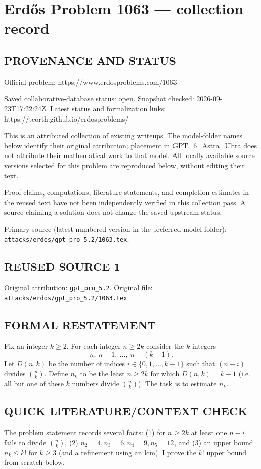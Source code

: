 \section*{Erd\H{o}s Problem 1063 --- collection record}

\subsection*{PROVENANCE AND STATUS}
Official problem: https://www.erdosproblems.com/1063

Saved collaborative-database status: open.
Snapshot checked: 2026-09-23T17:22:24Z.
Latest status and formalization links: https://teorth.github.io/erdosproblems/

This is an attributed collection of existing writeups. The model-folder names below identify their original attribution; placement in GPT\_6\_Astra\_Ultra does not attribute their mathematical work to that model. All locally available source versions selected for this problem are reproduced below, without editing their text.

Proof claims, computations, literature statements, and completion estimates in the reused text have not been independently verified in this collection pass. A source claiming a solution does not change the saved upstream status.

Primary source (latest numbered version in the preferred model folder): \texttt{attacks/erdos/gpt\_pro\_5.2/1063.tex}.

\subsection*{REUSED SOURCE 1}
Original attribution: \texttt{gpt\_pro\_5.2}.
Original file: \texttt{attacks/erdos/gpt\_pro\_5.2/1063.tex}.


\subsection*{FORMAL RESTATEMENT}
Fix an integer $k\ge 2$. For each integer $n\ge 2k$ consider the $k$ integers
\[
 n,\ n-1,\ \dots,\ n-(k-1).
\]
Let $D(n,k)$ be the number of indices $i\in\{0,1,\dots,k-1\}$ such that $(n-i)$ divides $\binom{n}{k}$.
Define $n_k$ to be the least $n\ge 2k$ for which $D(n,k)=k-1$ (i.e. all but one of these $k$ numbers divide $\binom{n}{k}$).
The task is to estimate $n_k$.

\subsection*{QUICK LITERATURE/CONTEXT CHECK}
The problem statement records several facts: (1) for $n\ge 2k$ at least one $n-i$ fails to divide $\binom{n}{k}$, (2) $n_2=4,n_3=6,n_4=9,n_5=12$, and (3) an upper bound $n_k\le k!$ for $k\ge 3$ (and a refinement using an lcm). I prove the $k!$ upper bound from scratch below.

